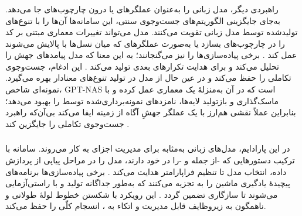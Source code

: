\subsubsection{\protect{}}
راهبردی دیگر، مدل زبانی را به‌عنوان عملگرهای  یا  درون چارچوب‌های  جا می‌دهد. به‌جای جایگزینی الگوریتم‌های جست‌وجوی سنتی، این سامانه‌ها آن‌ها را با تنوع‌های تولیدشده توسط مدل زبانی تقویت می‌کنند. مدل می‌تواند تغییرات معماری مبتنی بر کد را در چارچوب‌های  بسازد \cite{LLMatic2024} یا به‌صورت عملگرهای  که میان نسل‌ها با  پالایش می‌شوند عمل کند \cite{chen2023Evoprompting}. برخی پیاده‌سازی‌ها  را نیز می‌گنجانند؛ به این معنا که مدل پیامدهای جهش را تحلیل می‌کند و  برای هدایت تکرارهای بعدی تولید می‌کند \cite{ji2025RZNAS}. این ادغام،  جست‌وجوی تکاملی را حفظ می‌کند و در عین حال از  مدل در تولید تنوع‌های معنادار بهره می‌گیرد. نمونه‌ای شاخص، GPT-NAS است که در آن  به‌منزلهٔ یک  معماری عمل کرده و با ماسک‌گذاری و بازتولید لایه‌ها، نامزدهای نمونه‌برداری‌شده توسط  را بهبود می‌دهد؛ بنابراین عملاً نقشی هم‌ارز با یک عملگر جهشِ آگاه از زمینه ایفا می‌کند بی‌آن‌که راهبرد جست‌وجوی تکاملی را جایگزین کند \cite{Yu2025GPTNAS}.

\subsubsection{\protect{}}
در این پارادایم، مدل‌های زبانی به‌مثابه  برای مدیریت اجزای  به کار می‌روند. سامانه با ترکیب دستور‌هایی که -از جمله  و -را در خود دارند، مدل را در مراحل پیاپی از پردازش داده، انتخاب مدل تا تنظیم فراپارامتر هدایت می‌کند \cite{zhang2023AutomlGPTAutomaticMachineLearning, shen2023HuggingGPT}. برخی پیاده‌سازی‌ها برنامه‌های پیچیدهٔ یادگیری ماشین را به  تجزیه می‌کنند که به‌طور جداگانه تولید و با  راستی‌آزمایی می‌شوند تا سازگاری تضمین گردد \cite{xu2024largeTextToML}. این رویکرد با شکستن خطوط لولهٔ طولانی و ناهمگون به زیروظایف قابل مدیریت و اتکاء به ، انسجام کلّی را حفظ می‌کند.



